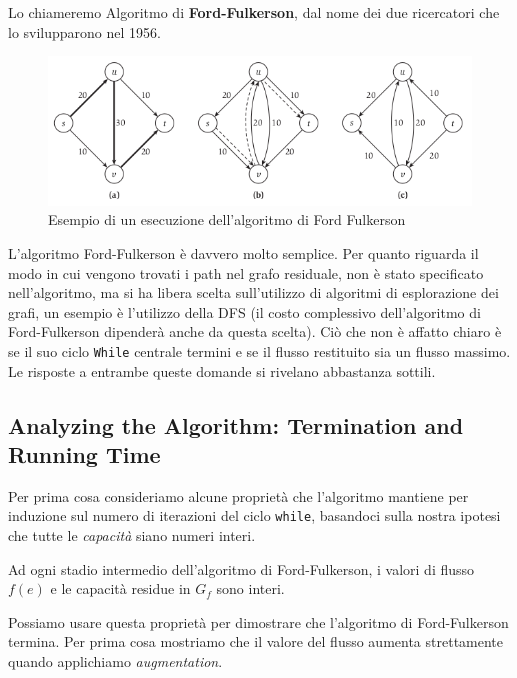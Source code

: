 Lo chiameremo Algoritmo di \textbf{Ford-Fulkerson}, dal nome dei due
ricercatori che lo svilupparono nel 1956.

\begin{figure}[H]
  \centering
  \includegraphics[width = 12 cm]{capitoli/network_flow/imgs/flow3.png}
  \caption{Esempio di un esecuzione dell'algoritmo di Ford Fulkerson}
\end{figure}

L'algoritmo Ford-Fulkerson è davvero molto semplice. Per quanto riguarda
il modo in cui vengono trovati i path nel grafo residuale, non è stato
specificato nell'algoritmo, ma si ha libera scelta sull'utilizzo di
algoritmi di esplorazione dei grafi, un esempio è l'utilizzo della DFS
(il costo complessivo dell'algoritmo di Ford-Fulkerson dipenderà anche
da questa scelta). Ciò che non è affatto chiaro è se il suo ciclo
\texttt{While} centrale termini e se il flusso restituito sia un flusso
massimo. Le risposte a entrambe queste domande si rivelano abbastanza
sottili.

\subsection{Analyzing the Algorithm: Termination and Running Time}

Per prima cosa consideriamo alcune proprietà che l'algoritmo mantiene
per induzione sul numero di iterazioni del ciclo \texttt{while},
basandoci sulla nostra ipotesi che tutte le \emph{capacità} siano numeri
interi.

\begin{myblockquote}
  Ad ogni stadio intermedio dell'algoritmo di Ford-Fulkerson, i valori di
  flusso $f(e)$ e le capacità residue in $G_f$ sono interi.
\end{myblockquote}

Possiamo usare questa proprietà per dimostrare che l'algoritmo di
Ford-Fulkerson termina. Per prima cosa mostriamo che il valore del
flusso aumenta strettamente quando applichiamo \emph{augmentation}.\\

